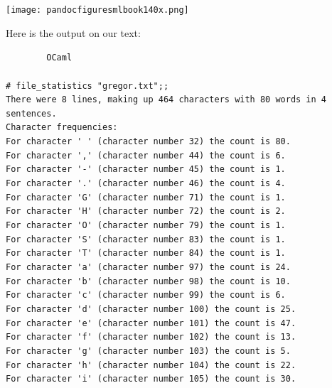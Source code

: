 \documentclass[]{book}
\newcommand{\smspace}{\vspace{4mm}}
\begin{document}
\medskip
\begin{center}
\noindent\texttt{[image: pandocfiguresmlbook140x.png]}
\end{center}
\medskip

\noindent Here is the output on our text:

\smspace
\noindent\verb!        OCaml!\\
\noindent\\
\noindent\verb!# file_statistics "gregor.txt";;!\\
\verb!There were 8 lines, making up 464 characters with 80 words in 4 sentences.!\\
\verb!Character frequencies:!\\
\verb!For character ' ' (character number 32) the count is 80.!\\
\verb!For character ',' (character number 44) the count is 6.!\\
\verb!For character '-' (character number 45) the count is 1.!\\
\verb!For character '.' (character number 46) the count is 4.!\\
\verb!For character 'G' (character number 71) the count is 1.!\\
\verb!For character 'H' (character number 72) the count is 2.!\\
\verb!For character 'O' (character number 79) the count is 1.!\\
\verb!For character 'S' (character number 83) the count is 1.!\\
\verb!For character 'T' (character number 84) the count is 1.!\\
\verb!For character 'a' (character number 97) the count is 24.!\\
\verb!For character 'b' (character number 98) the count is 10.!\\
\verb!For character 'c' (character number 99) the count is 6.!\\
\verb!For character 'd' (character number 100) the count is 25.!\\
\verb!For character 'e' (character number 101) the count is 47.!\\
\verb!For character 'f' (character number 102) the count is 13.!\\
\verb!For character 'g' (character number 103) the count is 5.!\\
\verb!For character 'h' (character number 104) the count is 22.!\\
\verb!For character 'i' (character number 105) the count is 30.!\\
\end{document}
